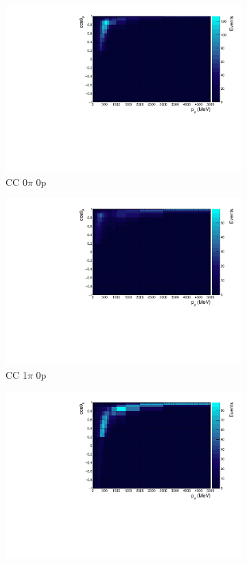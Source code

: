 \begin{figure}
\centering
\begin{subfigure}{.49\textwidth}
  \centering
  \includegraphics[width=0.9\linewidth]{figs/nd280_pmtmuu_cc0pi0p.pdf}
  \caption{CC 0$\pi$ 0p}
\end{subfigure}
\begin{subfigure}{.49\textwidth}
  \centering
  \includegraphics[width=0.9\linewidth]{figs/nd280_pmtmuu_cc1pi0p.pdf}
  \caption{CC 1$\pi$ 0p}
\end{subfigure}
\begin{subfigure}{.49\textwidth}
  \centering
  \includegraphics[width=0.9\linewidth]{figs/nd280_pmtmuu_cc0pi1p.pdf}

\end{subfigure}
\end{figure}
